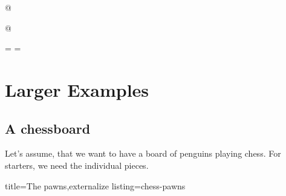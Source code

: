 \documentclass[parskip=half,english,numbers=noenddot,footnotes=nomultiple,oneside]{scrartcl}
\makeatletter
\def\current@indexfile{\jobname}
\let\@gobblekey\@gobble
\makeatother
\begin{document}
\begin{tcblisting}{@}
\begin{tikzpicture}
	\pingu[second shirt, second shirt raise=5mm]
\end{tikzpicture}
\end{tcblisting}
\endsubkeyexplain

{\def\pingu@color@secondshirt{<second-shirt-color>}
\begin{tcblisting}{@}
\begin{tikzpicture}
	\pingu[second shirt, second shirt neck=green]
\end{tikzpicture}
\end{tcblisting}
\endsubkeyexplain}


\newcommand\includecode[2][../tex/tikzpingus.sty]{}
\def\current@indexfile{\jobname-internals}
\def\@gobblekey#1{%
	\IfBeginWith{#1}{pingu@}{%
		\StrDel[1]{#1}{pingu@}[#1]\protected@xdef#1{#1}%
	}{%
	\IfBeginWith{#1}{@pingu@}{%
		\StrDel[1]{#1}{@pingu@}[#1]\protected@xdef#1{#1}%
	}{}%
}}
\newsavebox\warningpengu
{}=\hbox{}
\setbox\warningpengu=\hbox{}
\def\important{\par\mbox{\textit{Important:}\marginnote{\usebox\warningpengu}}}

\section{Larger Examples}

\subsection{A chessboard}

Let's assume, that we want to have a board of penguins playing chess. For starters, we need the individual pieces.
\begin{tcblisting}{title={The pawns},externalize listing=chess-pawns}
\tikz{\pingu[body=pingu@black]}
\tikz{\pingu[:back,xshift=3cm]}
\end{tcblisting}
\end{document}
